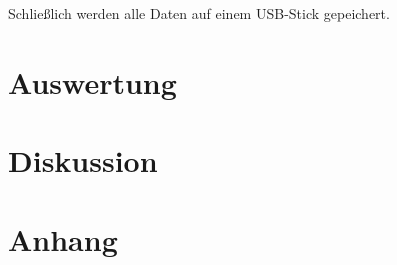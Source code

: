 \documentclass[12pt,a4paper,titlepage,headinclude,bibtotoc]{scrartcl}
\begin{document}
Schließlich werden alle Daten auf einem USB-Stick gepeichert.

\section{Auswertung}
\label{sec:auswertung}

\section{Diskussion}
\label{sec:diskussion}

\section{Anhang}



\end{document}
